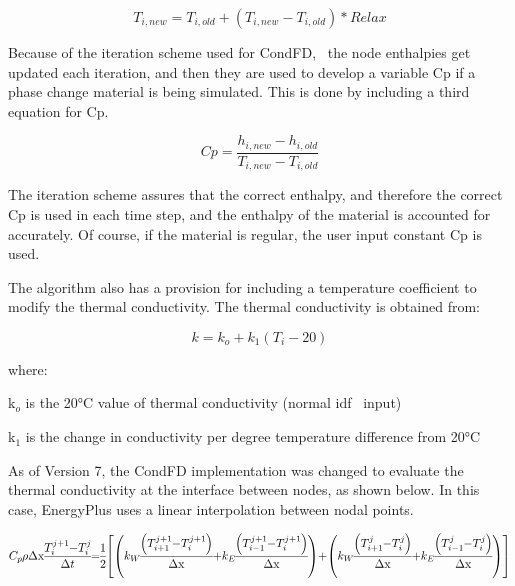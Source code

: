 \begin{equation}
{T_{i,new}} = {T_{i,old}} + \left( {{T_{i,new}} - {T_{i,old}}} \right)*Relax
\end{equation}

Because of the iteration scheme used for CondFD,~ the node enthalpies get updated each iteration, and then they are used to develop a variable Cp if a phase change material is being simulated. This is done by including a third equation for Cp.

\begin{equation}
Cp = \frac{{{h_{i,new}} - {h_{i,old}}}}{{{T_{i,new}} - {T_{i,old}}}}
\end{equation}

The iteration scheme assures that the correct enthalpy, and therefore the correct Cp is used in each time step, and the enthalpy of the material is accounted for accurately. Of course, if the material is regular, the user input constant Cp is used.

The algorithm also has a provision for including a temperature coefficient to modify the thermal conductivity. The thermal conductivity is obtained from:

\begin{equation}
k = {k_o} + {k_1}\left( {{T_i} - 20} \right)
\end{equation}

where:

k\(_{o}\) is the 20°C value of thermal conductivity (normal idf~ input)

k\(_{1}\) is the change in conductivity per degree temperature difference from 20°C

As of Version 7, the CondFD implementation was changed to evaluate the thermal conductivity at the interface between nodes, as shown below. In this case, EnergyPlus uses a linear interpolation between nodal points.

\begin{equation}
\medmuskip=0mu
\thinmuskip=0mu
\thickmuskip=0mu
\nulldelimiterspace=0pt
\scriptspace=0pt
{C_p}\rho {\rm{\Delta x}}\frac{{T_i^{j + 1} - T_i^j}}{{{\rm{\Delta }}t}} = \frac{1}{2}\left[ {\left( {{k_W}\frac{{\left( {T_{i + 1}^{j + 1} - T_i^{j + 1}} \right)}}{{{\rm{\Delta x}}}} + {k_E}\frac{{\left( {T_{i - 1}^{j + 1} - T_i^{j + 1}} \right)}}{{{\rm{\Delta x}}}}} \right) + \left( {{k_W}\frac{{\left( {T_{i + 1}^j - T_i^j} \right)}}{{{\rm{\Delta x}}}} + {k_E}\frac{{\left( {T_{i - 1}^j - T_i^j} \right)}}{{{\rm{\Delta x}}}}} \right)} \right]
\end{equation}

